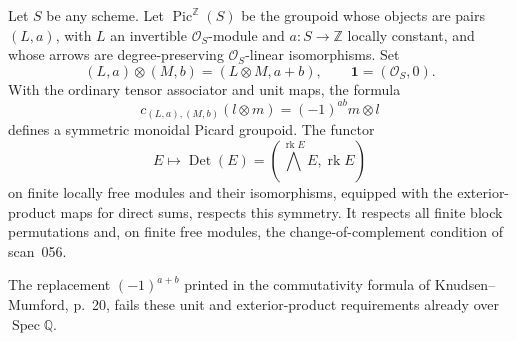 \begin{lemma}\label{C:graded-determinant-sign}
Let $S$ be any scheme.  Let $\operatorname{Pic}^{\mathbb Z}(S)$ be the
groupoid whose objects are pairs $(L,a)$, with $L$ an invertible
$\mathcal O_S$-module and $a:S\to\mathbb Z$ locally constant, and whose
arrows are degree-preserving $\mathcal O_S$-linear isomorphisms.  Set
\[
 (L,a)\otimes(M,b)=(L\otimes M,a+b),\qquad
 \symbf{1}=(\mathcal O_S,0).
\]
With the ordinary tensor associator and unit maps, the formula
\[
 c_{(L,a),(M,b)}(l\otimes m)=(-1)^{ab}m\otimes l
\]
defines a symmetric monoidal Picard groupoid.  The functor
\[
 E\longmapsto\operatorname{Det}(E)
       =(\textstyle\bigwedge^{\operatorname{rk}E}E,\operatorname{rk}E)
\]
on finite locally free modules and their isomorphisms, equipped with
the exterior-product maps for direct sums, respects this symmetry.
It respects all finite block permutations and, on finite free modules,
the change-of-complement condition of scan~056.

The replacement $(-1)^{a+b}$ printed in the commutativity formula of
Knudsen--Mumford, p.~20, fails these unit and exterior-product
requirements already over $\operatorname{Spec}\mathbb Q$.
\end{lemma}
